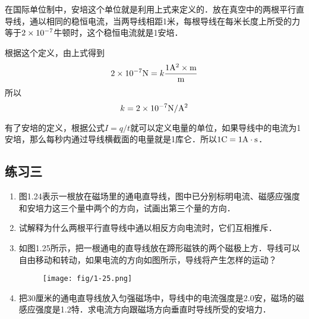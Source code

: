 在国际单位制中，安培这个单位就是利用上式来定义的．放在真空中的两根平行直导线，通以相同的稳恒电流，当两导线相距1米，每根导线在每米长度上所受的力等于$2\times10^{-7}$牛顿时，这个稳恒电流就是1安培．

根据这个定义，由上式得到
\[ 2\times10^{-7} {\rm N}=k\frac{1{\rm A^2}\times {\rm m}}{\rm m}\]
所以
\[k=2\times10^{-7}{{\rm N}/{\rm A^2}}\]

有了安培的定义，根据公式$I=q/t$就可以定义电量的单位，如果导线中的电流为1安培，那么每秒内通过导线横截面的电量就是1库仑．所以$1{\rm C}=1{\rm A}\cdot {\rm s}$．

\subsection*{练习三}
\begin{enumerate}
    \item 图1.24表示一根放在磁场里的通电直导线，图中已分别标明电流、磁感应强度和安培力这三个量中两个的方向，试画出第三个量的方向．
    \begin{figure}[htp]\centering
{}
    	\caption{ }
    \end{figure}
    \item 试解释为什么两根平行直导线中通以相反方向电流时，它们互相推斥．
    \item 如图1.25所示，把一根通电的直导线放在蹄形磁铁的两个磁极上方．导线可以自由移动和转动，如果电流的方向如图所示，导线将产生怎样的运动？
        \begin{figure}[htp]\centering
    	\texttt{[image: fig/1-25.png]}
    	\caption{ }
    \end{figure}
    \item 把30厘米的通电直导线放入匀强磁场中，导线中的电流强度是2.0安，磁场的磁感应强度是1.2特．求电流方向跟磁场方向垂直时导线所受的安培力．


\end{enumerate}
